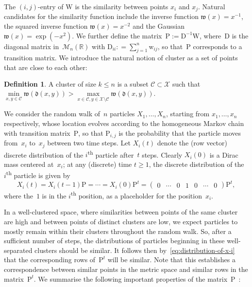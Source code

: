 \documentclass{amsart}[11pt]
\numberwithin{equation}{section}
\theoremstyle{definition}
\newtheorem{definition}[theorem]{Definition}
\newcommand{\Cc}{\mathcal{C}}
\newcommand{\Mm}{\mathcal{M}}
\newcommand{\Xx}{\mathcal{X}}
\newcommand{\ww}{\mathrm{w}}
\newcommand{\RR}{\mathbb{R}}
\newcommand{\PP}{\mathbb{P}}
\newcommand{\df}{\mathfrak{d}}
\newcommand{\wf}{\mathfrak{w}}
\newcommand{\Df}{\mathrm{D}}
\newcommand{\Wf}{\mathrm{W}}
\newcommand{\Pf}{\mathrm{P}}
\begin{document}
The $(i,j)$-entry of $\Wf$ is the similarity between points $x_i$ and $x_j$. Natural candidates for the similarity function include the inverse function $\wf(x) = x^{-1}$,
the squared inverse function $\wf(x) = x^{-2}$ and the Gaussian $\wf(x) = \exp(-x^2)$.
We further define the matrix~$\Pf:=\Df^{-1} \Wf$,
where~$\Df$ is the diagonal matrix in~$\Mm_{n}(\RR)$ with $\Df_{ii}: = \sum_{j = 1}^{n} \ww_{ij}$,
so that~$\Pf$ corresponds to a transition matrix.
We introduce the natural notion of cluster as a set of points that are close to each other:
\begin{definition}
\label{def:clusters}
A cluster of size $k\leq n$ is a subset $\Cc\subset \Xx$
such that $\min\limits_{x,y \in\Cc}\wf(\df(x,y)) > \max\limits_{x\in\Cc, y \in \Xx\setminus\Cc}\wf(\df(x,y))$.
\end{definition}

We consider the random walk of~$n$ particles $X_1,\ldots, X_n$, starting from $x_1,\ldots, x_n$ respectively, whose location evolves according to the homogeneous Markov chain with transition matrix~$\Pf$, so that $\Pf_{i,j}$ is the probability that the particle moves from~$x_i$ to~$x_j$ between two time steps.
Let $X_i(t)$ denote the (row vector) discrete distribution of the $i$\textsuperscript{th} particle after~$t$ steps.
Clearly $X_i(0)$ is a Dirac mass centered at~$x_i$; %
at any (discrete) time $t \geq 1$, the discrete distribution of the $i$\textsuperscript{th} particle is given by
\begin{equation}\label{eq:distribution-of-x-i}
    X_i(t) = X_i(t-1)\Pf = \cdots = X_i(0)\Pf^t = \begin{pmatrix} 0 & \cdots & 0 & 1 & 0 & \cdots & 0\end{pmatrix}\Pf^t,
\end{equation}
where the~$1$ is in the $i$\textsuperscript{th} position, 
as a placeholder for the position~$x_i$.

In a well-clustered space, where similarities between points of the same cluster are high and between points of distinct clusters are low, we expect particles to mostly remain within their clusters throughout the random walk. So, after a sufficient number of steps, the distributions of particles beginning in these well-separated clusters should be similar. It follows then by~\eqref{eq:distribution-of-x-i} that the corresponding rows of~$\Pf^t$ will be similar. Note that this establishes a correspondence between similar points in the metric space and similar rows in the matrix~$\Pf^t$.
We summarise the following important properties of the matrix~$\Pf$~\cite[Lemma 1, Lemma 2]{Azran06}:
\end{document}
